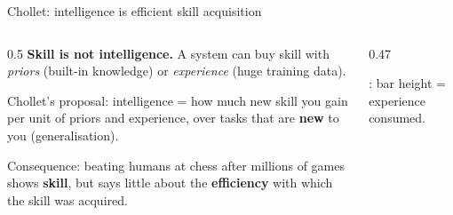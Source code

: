 \begin{frame}{Chollet: intelligence is efficient skill acquisition}
\begin{columns}[T]
\begin{column}{0.5\textwidth}
\small
\textbf{Skill is not intelligence.} A system can buy skill with \emph{priors} (built-in knowledge) or \emph{experience} (huge training data).

Chollet's proposal: intelligence = how much new skill you gain per unit of priors and experience, over tasks that are \textbf{new} to you (generalisation).

\vspace{1mm}
Consequence: beating humans at chess after millions of games shows \textbf{skill}, but says little about the \textbf{efficiency} with which the skill was acquired.
\end{column}
\begin{column}{0.47\textwidth}
\begin{sfig}[0.62]
\end{sfig}
{\scriptsize\illus: bar height = experience consumed.}
\end{column}
\end{columns}
\end{frame}


